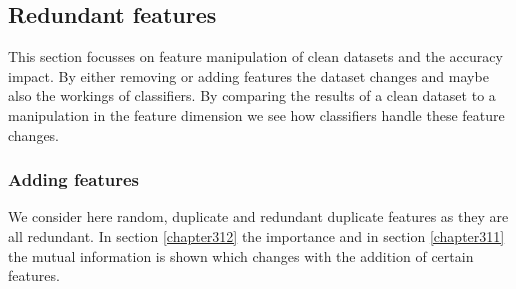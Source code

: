 \documentclass[a4paper,10pt]{article}
\begin{document}
\newpage
\subsection{Redundant features}
This section focusses on feature manipulation of clean datasets and the accuracy impact. By either removing or adding features the dataset changes and maybe also the workings of classifiers. By comparing the results of a clean dataset to a manipulation in the feature dimension we see how classifiers handle these feature changes.

\subsubsection{Adding features}
We consider here random, duplicate and redundant duplicate features as they are all redundant. In section \ref{chapter312} the importance and in section \ref{chapter311} the mutual information is shown which changes with the addition of certain features.\\
\end{document}

